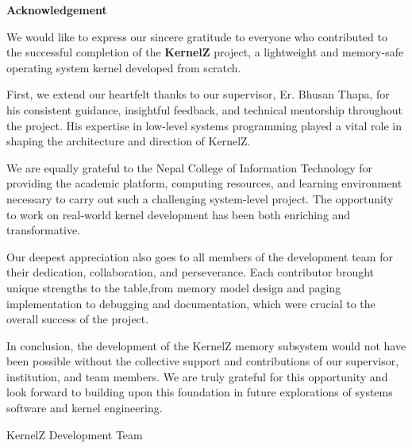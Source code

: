 \documentclass[12pt]{extarticle}
\begin{document}
\begin{titlepage}

\end{titlepage}

\onehalfspacing %


\begin{center}
	\textbf{Acknowledgement}
\end{center}

\noindent We would like to express our sincere gratitude to everyone who contributed to the successful completion of the \textbf{KernelZ} project, a lightweight and memory-safe operating system kernel developed from scratch.

\noindent First, we extend our heartfelt thanks to our supervisor, Er. Bhusan Thapa, for his consistent guidance, insightful feedback, and technical mentorship throughout the project. His expertise in low-level systems programming played a vital role in shaping the architecture and direction of KernelZ.

\noindent We are equally grateful to the Nepal College of Information Technology for providing the academic platform, computing resources, and learning environment necessary to carry out such a challenging system-level project. The opportunity to work on real-world kernel development has been both enriching and transformative.

\noindent Our deepest appreciation also goes to all members of the development team for their dedication, collaboration, and perseverance. Each contributor brought unique strengths to the table,from memory model design and paging implementation to debugging and documentation, which were crucial to the overall success of the project.

\noindent In conclusion, the development of the KernelZ memory subsystem would not have been possible without the collective support and contributions of our supervisor, institution, and team members. We are truly grateful for this opportunity and look forward to building upon this foundation in future explorations of systems software and kernel engineering.

\medskip
\begin{flushleft}
KernelZ Development Team
\end{flushleft}
\pagebreak
\end{document}
